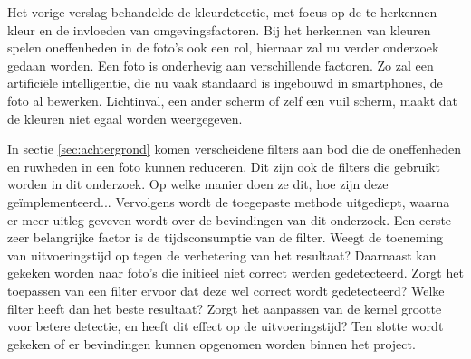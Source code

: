Het vorige verslag behandelde de kleurdetectie, met focus op de te herkennen kleur en de invloeden van omgevingsfactoren. Bij het herkennen van kleuren spelen oneffenheden in de foto's ook een rol, hiernaar zal nu verder onderzoek gedaan worden. Een foto is onderhevig aan verschillende factoren. Zo zal een artificiële intelligentie, die nu vaak standaard is ingebouwd in smartphones, de foto al bewerken. Lichtinval, een ander scherm of zelf een vuil scherm, maakt dat de kleuren niet egaal worden weergegeven.

In sectie \ref{sec:achtergrond} komen verscheidene filters aan bod die de oneffenheden en ruwheden in een foto kunnen reduceren. Dit zijn ook de filters die gebruikt worden in dit onderzoek. Op welke manier doen ze dit, hoe zijn deze geïmplementeerd... Vervolgens wordt de toegepaste methode uitgediept, waarna er meer uitleg geveven wordt over de bevindingen van dit onderzoek. Een eerste zeer belangrijke factor is de tijdsconsumptie van de filter. Weegt de toeneming van uitvoeringstijd op tegen de verbetering van het resultaat? Daarnaast kan gekeken worden naar foto's die initieel niet correct werden gedetecteerd. Zorgt het toepassen van een filter ervoor dat deze wel correct wordt gedetecteerd? Welke filter heeft dan het beste resultaat? Zorgt het aanpassen van de kernel grootte voor betere detectie, en heeft dit effect op de uitvoeringstijd?  Ten slotte wordt gekeken of er bevindingen kunnen opgenomen worden binnen het project.